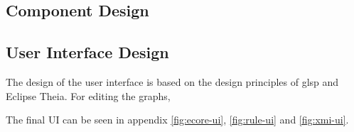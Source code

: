   \subsection{Component Design}
  \label{subsec:component-design}

  \subsection{User Interface Design}
  \label{subsec:user-interface-design}

  The design of the user interface is based on the design principles of \ac{glsp} and Eclipse Theia. For editing the graphs, 

  The final UI can be seen in appendix \ref{fig:ecore-ui}, \ref{fig:rule-ui} and \ref{fig:xmi-ui}.

